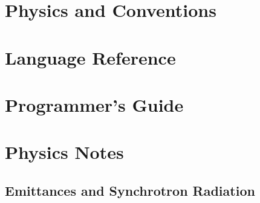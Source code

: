 \documentclass{book}
\begin{document}




\tableofcontents
\listoffigures
\listoftables

\part{Physics and Conventions}



\part{Language Reference}










\part{Programmer's Guide}






%


\part{Physics Notes}
\chapter{Emittances and Synchrotron Radiation}


\begin{theindex}
\end{theindex}
\end{document}
